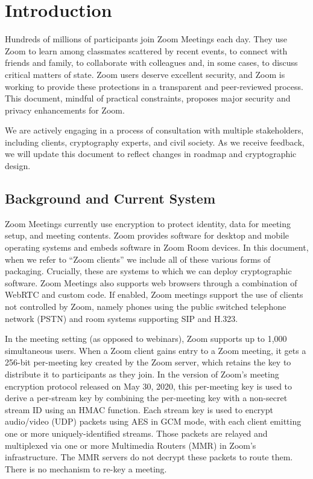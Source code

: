 \section{Introduction}
Hundreds of millions of participants join Zoom Meetings each day. They use Zoom to learn among
classmates scattered by recent events, to connect with friends and family, to collaborate with
colleagues and, in some cases, to discuss critical matters of state. Zoom users deserve excellent
security, and Zoom is working to provide these protections in a transparent and peer-reviewed
process. This document, mindful of practical constraints, proposes major security and privacy
enhancements for Zoom.

We are actively engaging in a process of consultation with multiple stakeholders, including clients, cryptography experts, and civil society. As we receive feedback, we will update this document to reflect changes in roadmap and cryptographic design.

\subsection{Background and Current System}
Zoom Meetings currently use encryption to protect identity, data for meeting setup, and meeting contents. Zoom provides software for desktop and mobile operating systems and embeds software in Zoom Room devices. In this document, when we refer to ``Zoom clients'' we include all of these various forms of packaging. Crucially, these are systems to which we can deploy cryptographic software. Zoom Meetings also supports web browsers through a combination of WebRTC and custom code. If enabled, Zoom meetings support the use of clients not controlled by Zoom, namely phones using the public switched telephone network (PSTN) and room systems supporting SIP and H.323.

In the meeting setting (as opposed to webinars), Zoom supports up to 1,000 simultaneous users. When
a Zoom client gains entry to a Zoom meeting, it gets a 256-bit per-meeting key created by the Zoom
server, which retains the key to distribute it to participants as they join. In the version of Zoom's meeting encryption protocol released on May 30, 2020, this per-meeting key is used to derive a per-stream key by combining the per-meeting key with a non-secret stream ID using an HMAC function. Each stream key is used to encrypt audio/video (UDP) packets using AES in GCM mode, with each client emitting one or more uniquely-identified streams. Those packets are relayed and multiplexed via one or more Multimedia Routers (MMR) in Zoom's infrastructure. The MMR servers do not decrypt these packets to route them. There is no mechanism to re-key a meeting.


